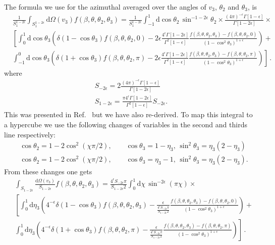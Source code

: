 \documentclass[a4paper,11pt]{article}
\numberwithin{equation}{section}
\newcommand{\dd}{\text{d}}
\newcommand{\eps}{\epsilon}
\begin{document}
The formula we use for the azimuthal averaged 
over the angles of  $v_3$, $\theta_2$ and $\theta_3$, is 
\begin{align*}
& \frac{1}{S_1^{1-2\eps}} \int_{S_1^{1-2\eps}}
\dd \Omega(v_3)f(\beta,\theta,\theta_2,\theta_3)=
\frac{1}{S_1^{1-2\eps}} 
\int_{-1}^{1}\dd\!\cos{\theta_2}\,\sin^{-1-2\epsilon}\theta_2 \times
\frac{(4\pi)^{-\eps}\Gamma[1-\eps]}{\Gamma[1-2\eps]}\times \\
&\left[ 
\int_{0}^{1}\dd\!\cos{\theta_3} \left( \delta(1-\cos{\theta_3}) f(\beta,\theta,\theta_2,0)
-2\eps \frac{4^\eps \Gamma[1-2\eps]}{\Gamma^2[1-\eps]} 
\frac{f(\beta,\theta,\theta_2,\theta_3)-
f(\beta,\theta,\theta_2,0)}{\left( 1-\cos^2\theta_3\right)^{1+\epsilon}}  \right)
\right.+\\
&\left.
\int^{0}_{-1}\dd\!\cos{\theta_3} \left( \delta(1+\cos{\theta_3}) f(\beta,\theta,\theta_2,\pi)
-2\eps \frac{4^\eps \Gamma[1-2\eps]}{\Gamma^2[1-\eps]} 
\frac{f(\beta,\theta,\theta_2,\theta_3)-f(\beta,\theta,
\theta_2,\pi)}{\left( 1-\cos^2\theta_3\right)^{1+\epsilon}}  \right)
\right]\,.
\end{align*}
where
\begin{align}
S_{-2\eps}=  2\frac{(4\pi)^{-\epsilon}\Gamma[1-\eps]}{\Gamma[1-2\eps]}\\
S_{1-2\eps}= \frac{\pi 4^\eps  \Gamma[1-2\eps]}{\Gamma^2[1-\eps]} S_{-2\eps}.
\end{align}
This was presented in Ref.~\cite{Czakon:2014oma} but we have also re-derived. 
To map this integral to a hypercube we use the following changes 
of variables in the second
and thirds line respectively:
\begin{align*}
&\cos\theta_2= 1-2 \cos^2(\chi \pi /2) , 
\qquad \cos\theta_3= 1-\eta_3, \,
\sin^2\theta_3=\eta_3(2-\eta_3) \\
&\cos\theta_2= 1-2 \cos^2(\chi \pi /2) , 
\qquad \cos\theta_3= \eta_3-1,\,
 \sin^2\theta_3=\eta_3(2-\eta_3).
\end{align*}
From these changes one gets
\begin{align}
&  \int_{S_{1-2\eps}}\frac{\dd \Omega(v_3)}{S_{1-2\eps}}
f(\beta,\theta,\theta_2,\theta_3)=
\frac{4^\eps S_{-2\eps}\pi}{S_{1-2\eps}2}
\int_{0}^{1}  \dd \chi \, \sin^{-2\epsilon}(\pi \chi) \times
 \nonumber\\
&\left[ 
\int_{0}^{1}\dd \eta_3
\left( 4^{-\eps}
\delta(1-\cos{\theta_3}) f(\beta,\theta,\theta_2,\theta_3)
-\frac{\eps}{\frac{4^\eps S_{-2\eps}\pi}{S_{1-2\eps}2}} 
\frac{f(\beta,\theta,\theta_2,\theta_3)-f(\beta,\theta,
\theta_2,0)}{\left( 1-\cos^2\theta_3\right)^{1+\epsilon}}  \right)
\right.+\nonumber \\
&\left.
\int_{0}^{1}\dd \eta_3 \left( 
4^{-\eps} \delta(1+\cos{\theta_3}) f(\beta,\theta,
\theta_2,\pi)
-\frac{\eps}{\frac{4^\eps S_{-2\eps}\pi}{S_{1-2\eps}2}} 
\frac{f(\beta,\theta,\theta_2,\theta_3)-f(\beta,\theta,
\theta_2,\pi)}{\left( 1-\cos^2\theta_3\right)^{1+\epsilon}}  \right) 
\right]\,.\label{eq:v3average}
\end{align}
\end{document}
